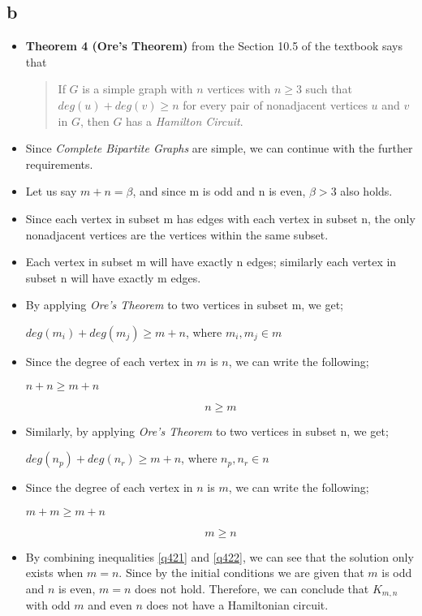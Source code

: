 \documentclass[11pt]{article}
\begin{document}
\subsection*{b}
\begin{itemize}
    \item  \textbf{Theorem 4 (Ore's Theorem)} from the Section 10.5 of the textbook says that 
    \begin{quote}
        If $G$ is a simple graph with $n$ vertices with $n \geq 3$ such that
$deg(u) + deg(v) \geq n$ for every pair of nonadjacent vertices $u$ and $v$ in $G$, then $G$ has a \textit{Hamilton Circuit}.
    \end{quote}
    \item Since \textit{Complete Bipartite Graphs} are simple, we can continue with the further requirements.
    \item Let us say $m + n = \beta$, and since m is odd and n is even, $\beta > 3$ also holds. 
    \item Since each vertex in subset m has edges with each vertex in subset n, the only nonadjacent vertices are the vertices within the same subset. 
    \item Each vertex in subset m will have exactly n edges; similarly each vertex in subset n will have exactly m edges.
    \item By applying \textit{Ore's Theorem} to two vertices in subset m, we get; 
    \begin{center} $ deg(m_i) + deg(m_j) \geq m+n $, where $m_i, m_j \in m$ \end{center}
    \item Since the degree of each vertex in $m$ is $n$, we can write the following;
    \begin{center} $ n + n \geq m + n $ \end{center}
    \begin{equation} n \geq m  
    \label{q421}
    \end{equation} 
    \item Similarly, by applying \textit{Ore's Theorem} to two vertices in subset n, we get;
    \begin{center} $ deg(n_p) + deg(n_r) \geq m+n $, where $n_p, n_r \in n$ \end{center}
    \item Since the degree of each vertex in $n$ is $m$, we can write the following;
    \begin{center} $ m + m \geq m + n $ \end{center}
    \begin{equation} m \geq n 
    \label{q422} \end{equation} 
    \item By combining inequalities \eqref{q421} and \eqref{q422}, we can see that the solution only exists when $m = n$. Since by the initial conditions we are given that $m$ is odd and $n$ is even, $m=n$ does not hold. Therefore, we can conclude that $K_{m,n}$ with odd $m$ and even $n$ does not have a Hamiltonian circuit.
\end{itemize} 
\end{document}
